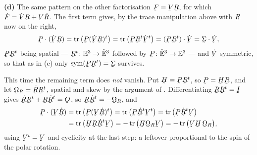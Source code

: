 \begin{solution}
\medskip
\noindent\textbf{(d)}
The same pattern on the other factorisation $\bF=\bV\bR$, for which
$\dot\bF=\dot\bV\bR+\bV\dot\bR$. The first term gives, by the trace
manipulation above with $\bR$ now on the right,
\[
   \bP\cdot(\dot\bV\bR)=\tr\big(\bP(\dot\bV\bR)^{t}\big)
   =\tr\big(\bP\bR^{t}\dot\bV^{t}\big)
   =(\bP\bR^{t})\cdot\dot\bV
   =\vek\Sigma\cdot\dot\bV ,
\]
$\bP\bR^{t}$ being spatial --- $\bR^{t}\colon\Vt\to\hVt$ followed by
$\bP\colon\hVt\to\Vt$ --- and $\dot\bV$ symmetric, so that as in (c)
only $\Sym(\bP\bR^{t})=\vek\Sigma$ survives.

This time the remaining term does \emph{not} vanish. Put
$\bH=\bP\bR^{t}$, so $\bP=\bH\bR$, and let $\bOm_{R}=\dot\bR\bR^{t}$,
spatial and skew by the argument of . Differentiating
$\bR\bR^{t}=\I$ gives $\dot\bR\bR^{t}+\bR\dot\bR^{t}=\Ob$, so
$\bR\dot\bR^{t}=-\bOm_{R}$, and
\[
\begin{aligned}
   \bP\cdot(\bV\dot\bR)
   &=\tr\big(\bP(\bV\dot\bR)^{t}\big)
    =\tr\big(\bP\dot\bR^{t}\bV^{t}\big)
    =\tr\big(\bP\dot\bR^{t}\bV\big)\\
   &=\tr\big(\bH\bR\dot\bR^{t}\bV\big)
    =-\tr\big(\bH\bOm_{R}\bV\big)
    =-\tr\big(\bV\bH\,\bOm_{R}\big) ,
\end{aligned}
\]
using $\bV^{t}=\bV$ and cyclicity at the last step: a leftover
proportional to the spin of the polar rotation.


\end{solution}
